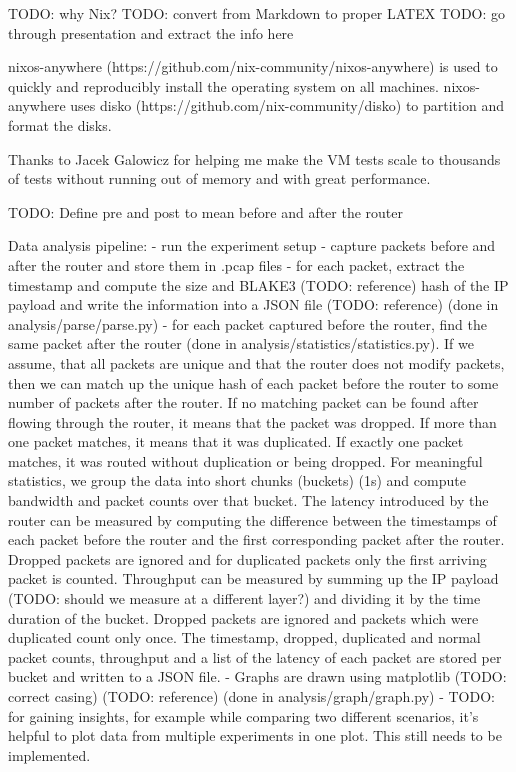 TODO: why Nix?
TODO: convert from Markdown to proper LATEX
TODO: go through presentation and extract the info here

nixos-anywhere (https://github.com/nix-community/nixos-anywhere) is used to quickly and reproducibly install the operating system on all machines.
nixos-anywhere uses disko (https://github.com/nix-community/disko) to partition and format the disks.


Thanks to Jacek Galowicz for helping me make the VM tests scale to thousands of tests without running out of memory and with great performance.

TODO: Define pre and post to mean before and after the router

Data analysis pipeline:
- run the experiment setup
- capture packets before and after the router and store them in .pcap files
- for each packet, extract the timestamp and compute the size and BLAKE3 (TODO: reference) hash of the IP payload and write the information into a JSON file (TODO: reference) (done in analysis/parse/parse.py)
- for each packet captured before the router, find the same packet after the router (done in analysis/statistics/statistics.py). If we assume, that all packets are unique and that the router does not modify packets, then we can match up the unique hash of each packet before the router to some number of packets after the router. If no matching packet can be found after flowing through the router, it means that the packet was dropped. If more than one packet matches, it means that it was duplicated. If exactly one packet matches, it was routed without duplication or being dropped. For meaningful statistics, we group the data into short chunks (buckets) (1s) and compute bandwidth and packet counts over that bucket. The latency introduced by the router can be measured by computing the difference between the timestamps of each packet before the router and the first corresponding packet after the router. Dropped packets are ignored and for duplicated packets only the first arriving packet is counted. Throughput can be measured by summing up the IP payload (TODO: should we measure at a different layer?) and dividing it by the time duration of the bucket. Dropped packets are ignored and packets which were duplicated count only once. The timestamp, dropped, duplicated and normal packet counts, throughput and a list of the latency of each packet are stored per bucket and written to a JSON file.
- Graphs are drawn using matplotlib (TODO: correct casing) (TODO: reference) (done in analysis/graph/graph.py)
- TODO: for gaining insights, for example while comparing two different scenarios, it's helpful to plot data from multiple experiments in one plot. This still needs to be implemented.


